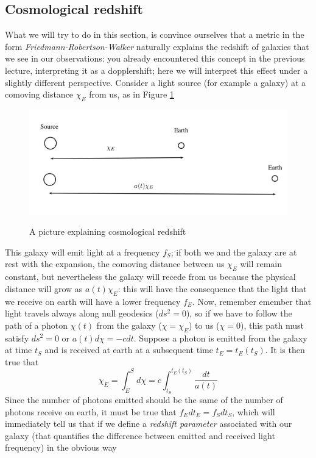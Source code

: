 \subsection{Cosmological redshift}
What we will try to do in this section, is convince ourselves that a metric in the form \textit{Friedmann-Robertson-Walker} naturally explains the redshift of galaxies that we see in our observations: you already encountered this concept in the previous lecture, interpreting it as a dopplershift; here we will interpret this effect under a slightly different perspective. Consider a light source (for example a galaxy) at a comoving distance $\chi_E$ from us, as in Figure \ref{redshift}
\begin{figure}
\begin{center}
\includegraphics[scale=0.8]{Draw/redshift.png}
\label{}
\end{center}
\caption{A picture explaining cosmological redshift}
\label{redshift}
\end{figure}
This galaxy will emit light at a frequency $f_S$; if both we and the galaxy are at rest with the expansion, the comoving distance between us $\chi_E$ will remain constant, but nevertheless the galaxy will recede from us because the physical distance will grow as $a(t)\chi_E$: this will have the consequence that the light that we receive on earth will have a lower frequency $f_E$.  Now, remember emember that light travels always along null geodesics ($ds^2=0$), so if we have to follow the path of a photon $\chi(t)$ from the galaxy ($\chi=\chi_E$) to us ($\chi=0$), this path must satisfy $ds^2=0$ or $a(t)d\chi=-cdt$. Suppose a photon is emitted from the galaxy at time $t_S$ and is received at earth at a subsequent time $t_E=t_E(t_S)$. It is then true that 
\begin{equation}
\label{comdis}
\chi_E=\int_E^Sd\chi=c\int_{t_S}^{t_E(t_S)}\frac{dt}{a(t)}
\end{equation}
Since the number of photons emitted should be the same of the number of photons receive on earth, it must be true that $f_Edt_E=f_Sdt_S$, which will immediately tell us that if we define a \textit{redshift parameter} associated with our galaxy (that quantifies the difference between emitted and received light frequency) in the obvious way

